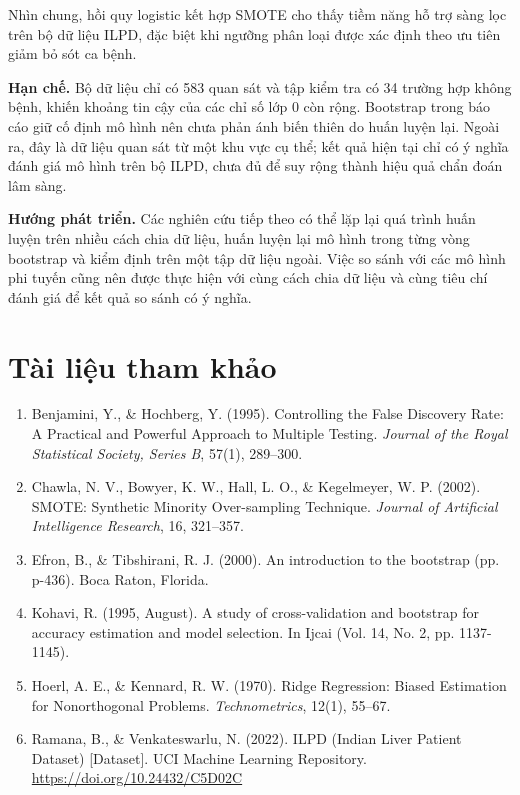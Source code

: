 \documentclass[14pt,a4paper]{extarticle}\usepackage[]{graphicx}\usepackage[]{xcolor}
\begin{document}
Nhìn chung, hồi quy logistic kết hợp SMOTE cho thấy tiềm năng hỗ trợ sàng lọc trên bộ dữ liệu ILPD, 
đặc biệt khi ngưỡng phân loại được xác định theo ưu tiên giảm bỏ sót ca bệnh. 

\textbf{Hạn chế.} Bộ dữ liệu chỉ có 583 quan sát và tập kiểm tra có 34 trường
hợp không bệnh, khiến khoảng tin cậy của các chỉ số lớp 0 còn rộng. Bootstrap
trong báo cáo giữ cố định mô hình nên chưa phản ánh biến thiên do huấn luyện
lại. Ngoài ra, đây là dữ liệu quan sát từ một khu vực cụ thể; kết quả hiện tại
chỉ có ý nghĩa đánh giá mô hình trên bộ ILPD, chưa đủ để suy rộng thành hiệu
quả chẩn đoán lâm sàng.

\textbf{Hướng phát triển.} Các nghiên cứu tiếp theo có thể lặp lại quá trình
huấn luyện trên nhiều cách chia dữ liệu, huấn luyện lại mô hình trong từng
vòng bootstrap và kiểm định trên một tập dữ liệu ngoài. Việc so sánh với các
mô hình phi tuyến cũng nên được thực hiện với cùng cách chia dữ liệu và cùng
tiêu chí đánh giá để kết quả so sánh có ý nghĩa.

\clearpage
\section*{Tài liệu tham khảo}

\begin{enumerate}
  \item Benjamini, Y., \& Hochberg, Y. (1995). Controlling the False
        Discovery Rate: A Practical and Powerful Approach to Multiple
        Testing. \emph{Journal of the Royal Statistical Society, Series
        B}, 57(1), 289--300.
  \item Chawla, N. V., Bowyer, K. W., Hall, L. O., \& Kegelmeyer, W. P.
        (2002). SMOTE: Synthetic Minority Over-sampling Technique.
        \emph{Journal of Artificial Intelligence Research}, 16, 321--357.
  \item Efron, B., \& Tibshirani, R. J. (2000). An introduction to the
        bootstrap (pp. p-436). Boca Raton, Florida.
  \item Kohavi, R. (1995, August). A study of cross-validation and bootstrap
        for accuracy estimation and model selection. In Ijcai (Vol. 14, No. 2, pp. 1137-1145).
  \item Hoerl, A. E., \& Kennard, R. W. (1970). Ridge Regression: Biased
        Estimation for Nonorthogonal Problems. \emph{Technometrics},
        12(1), 55--67.
  \item Ramana, B., \& Venkateswarlu, N. (2022). ILPD (Indian Liver
        Patient Dataset) [Dataset]. UCI Machine Learning Repository.
        \url{https://doi.org/10.24432/C5D02C}
\end{enumerate}
\end{document}
